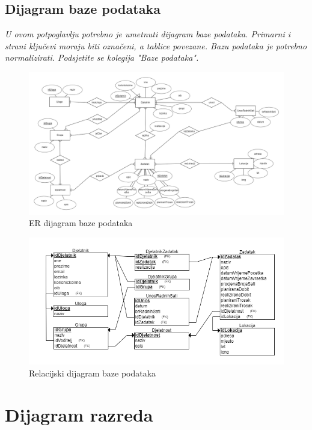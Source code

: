 			\subsection{Dijagram baze podataka}
				\textit{ U ovom potpoglavlju potrebno je umetnuti dijagram baze podataka. Primarni i strani ključevi moraju biti označeni, a tablice povezane. Bazu podataka je potrebno normalizirati. Podsjetite se kolegija "Baze podataka".}
				
				\begin{figure}[H]
					\centering
					\includegraphics[width=\textwidth]{slike/ERdijagram.png}
					\caption{ER dijagram baze podataka}
				\end{figure}
			
				\begin{figure}[H]
					\centering
					\includegraphics[width=\textwidth]{slike/RelDijagram.png}
					\caption{Relacijski dijagram baze podataka}
				\end{figure}		
			\eject
			
			
		\section{Dijagram razreda}
		
